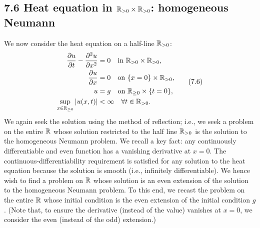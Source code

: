 \subsection{7.6 Heat equation in $\mathbb{R}_{>0} \times \mathbb{R}_{>0}$: homogeneous Neumann}
We now consider the heat equation on a half-line $\mathbb{R}_{>0}$:
\begin{equation*}
    \begin{aligned}
        \frac{\partial u}{\partial t} - \frac{\partial^2 u}{\partial x^2} &= 0 \quad \text{in } \mathbb{R}_{>0} \times \mathbb{R}_{>0}, \\
        \frac{\partial u}{\partial x} &= 0 \quad \text{on } \{x = 0\} \times \mathbb{R}_{>0}, \\
        u &= g \quad \text{on } \mathbb{R}_{\geq 0} \times \{t = 0\}, \\
        \sup_{x \in \mathbb{R}_{\geq 0}} |u(x, t)| &< \infty \quad \forall t \in \mathbb{R}_{>0}.
    \end{aligned} \tag{7.6}
\end{equation*}
We again seek the solution using the method of reflection; i.e., we seek a problem on the entire $\mathbb{R}$ whose solution restricted to the half line $\mathbb{R}_{>0}$ is the solution to the homogeneous Neumann problem. We recall a key fact: any continuously differentiable and even function has a vanishing derivative at $x = 0$. The continuous-differentiability requirement is satisfied for any solution to the heat equation because the solution is smooth (i.e., infinitely differentiable). We hence wish to find a problem on $\mathbb{R}$ whose solution is an even extension of the solution to the homogeneous Neumann problem. To this end, we recast the problem on the entire $\mathbb{R}$ whose initial condition is the even extension of the initial condition $g$. (Note that, to ensure the derivative (instead of the value) vanishes at $x = 0$, we consider the even (instead of the odd) extension.)

